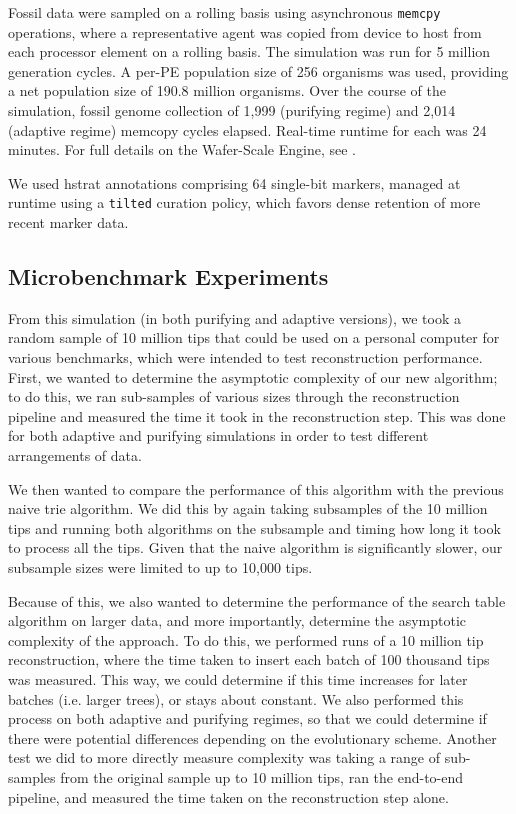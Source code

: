 Fossil data were sampled on a rolling basis using asynchronous \texttt{memcpy} operations, where a representative agent was copied from device to host from each processor element on a rolling basis.
The simulation was run for 5 million generation cycles.
A per-PE population size of 256 organisms was used, providing a net population size of 190.8 million organisms.
Over the course of the simulation, fossil genome collection of 1,999 (purifying regime) and 2,014 (adaptive regime) memcopy cycles elapsed.
Real-time runtime for each was 24 minutes.
For full details on the Wafer-Scale Engine, see \citep{moreno2024trackable}.

We used hstrat annotations comprising 64 single-bit markers, managed at runtime using a \texttt{tilted} curation policy, which favors dense retention of more recent marker data.

\subsection{Microbenchmark Experiments}

From this simulation (in both purifying and adaptive versions), we took a random sample of 10 million tips that could be used on a personal computer for various benchmarks, which were intended to test reconstruction performance.
First, we wanted to determine the asymptotic complexity of our new algorithm; to do this, we ran sub-samples of various sizes through the reconstruction pipeline and measured the time it took in the reconstruction step.
This was done for both adaptive and purifying simulations in order to test different arrangements of data.

We then wanted to compare the performance of this algorithm with the previous naive trie algorithm.
We did this by again taking subsamples of the 10 million tips and running both algorithms on the subsample and timing how long it took to process all the tips.
Given that the naive algorithm is significantly slower, our subsample sizes were limited to up to 10,000 tips.

Because of this, we also wanted to determine the performance of the search table algorithm on larger data, and more importantly, determine the asymptotic complexity of the approach. 
To do this, we performed runs of a 10 million tip reconstruction, where the time taken to insert each batch of 100 thousand tips was measured.
This way, we could determine if this time increases for later batches (i.e. larger trees), or stays about constant.
We also performed this process on both adaptive and purifying regimes, so that we could determine if there were potential differences depending on the evolutionary scheme.
Another test we did to more directly measure complexity was taking a range of sub-samples from the original sample up to 10 million tips, ran the end-to-end pipeline, and measured the time taken on the reconstruction step alone.

